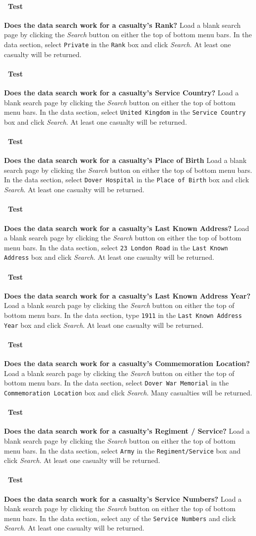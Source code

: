 \documentclass[12pt]{article}
\newcounter{Test}
\newcommand{\test}[1]{%
\stepcounter{Test}%
\paragraph{\Circle\ Test \theTest} \textbf{#1} }
\begin{document}
\test{Does the data search work for a casualty's Rank?}
Load a blank search page by clicking the \textit{Search} button on either the top of bottom menu bars. In the data section, select \texttt{Private} in the \texttt{Rank} box and click \textit{Search}. At least one casualty will be returned.

\test{Does the data search work for a casualty's Service Country?}
Load a blank search page by clicking the \textit{Search} button on either the top of bottom menu bars. In the data section, select \texttt{United Kingdom} in the \texttt{Service Country} box and click \textit{Search}. At least one casualty will be returned.

\test{Does the data search work for a casualty's Place of Birth}
Load a blank search page by clicking the \textit{Search} button on either the top of bottom menu bars. In the data section, select \texttt{Dover Hospital} in the \texttt{Place of Birth} box and click \textit{Search}. At least one casualty will be returned.

\test{Does the data search work for a casualty's Last Known Address?}
Load a blank search page by clicking the \textit{Search} button on either the top of bottom menu bars. In the data section, select \texttt{23 London Road} in the \texttt{Last Known Address} box and click \textit{Search}. At least one casualty will be returned.

\test{Does the data search work for a casualty's Last Known Address Year?}
Load a blank search page by clicking the \textit{Search} button on either the top of bottom menu bars. In the data section, type \texttt{1911} in the \texttt{Last Known Address Year} box and click \textit{Search}. At least one casualty will be returned.

\test{Does the data search work for a casualty's Commemoration Location?}
Load a blank search page by clicking the \textit{Search} button on either the top of bottom menu bars. In the data section, select \texttt{Dover War Memorial} in the \texttt{Commemoration Location} box and click \textit{Search}. Many casualties will be returned.

\test{Does the data search work for a casualty's Regiment / Service?}
Load a blank search page by clicking the \textit{Search} button on either the top of bottom menu bars. In the data section, select \texttt{Army} in the \texttt{Regiment/Service} box and click \textit{Search}. At least one casualty will be returned.

\test{Does the data search work for a casualty's Service Numbers?}
Load a blank search page by clicking the \textit{Search} button on either the top of bottom menu bars. In the data section, select any of the \texttt{Service Numbers} and click \textit{Search}. At least one casualty will be returned.
\end{document}
